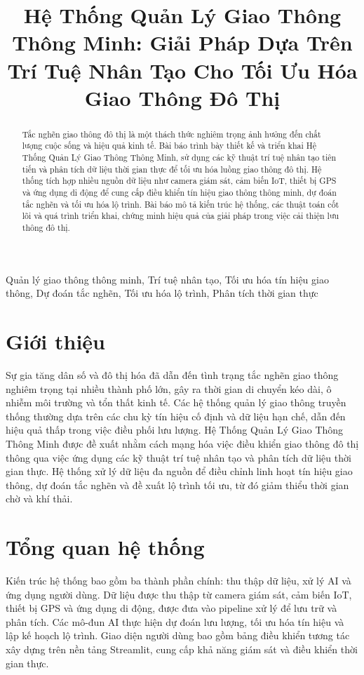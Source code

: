 \documentclass[conference]{IEEEtran}
\title{Hệ Thống Quản Lý Giao Thông Thông Minh: Giải Pháp Dựa Trên Trí Tuệ Nhân Tạo Cho Tối Ưu Hóa Giao Thông Đô Thị}
\author{
    \IEEEauthorblockN{Tên Tác Giả}
    \IEEEauthorblockA{Khoa Công Nghệ Thông Tin\\
    Tên Trường Đại Học\\
    Email: tacgia@example.com}
}
\begin{document}
\maketitle

\begin{abstract}
Tắc nghẽn giao thông đô thị là một thách thức nghiêm trọng ảnh hưởng đến chất lượng cuộc sống và hiệu quả kinh tế. Bài báo trình bày thiết kế và triển khai Hệ Thống Quản Lý Giao Thông Thông Minh, sử dụng các kỹ thuật trí tuệ nhân tạo tiên tiến và phân tích dữ liệu thời gian thực để tối ưu hóa luồng giao thông đô thị. Hệ thống tích hợp nhiều nguồn dữ liệu như camera giám sát, cảm biến IoT, thiết bị GPS và ứng dụng di động để cung cấp điều khiển tín hiệu giao thông thông minh, dự đoán tắc nghẽn và tối ưu hóa lộ trình. Bài báo mô tả kiến trúc hệ thống, các thuật toán cốt lõi và quá trình triển khai, chứng minh hiệu quả của giải pháp trong việc cải thiện lưu thông đô thị.
\end{abstract}

\begin{IEEEkeywords}
Quản lý giao thông thông minh, Trí tuệ nhân tạo, Tối ưu hóa tín hiệu giao thông, Dự đoán tắc nghẽn, Tối ưu hóa lộ trình, Phân tích thời gian thực
\end{IEEEkeywords}

\section{Giới thiệu}
Sự gia tăng dân số và đô thị hóa đã dẫn đến tình trạng tắc nghẽn giao thông nghiêm trọng tại nhiều thành phố lớn, gây ra thời gian di chuyển kéo dài, ô nhiễm môi trường và tổn thất kinh tế. Các hệ thống quản lý giao thông truyền thống thường dựa trên các chu kỳ tín hiệu cố định và dữ liệu hạn chế, dẫn đến hiệu quả thấp trong việc điều phối lưu lượng. Hệ Thống Quản Lý Giao Thông Thông Minh được đề xuất nhằm cách mạng hóa việc điều khiển giao thông đô thị thông qua việc ứng dụng các kỹ thuật trí tuệ nhân tạo và phân tích dữ liệu thời gian thực. Hệ thống xử lý dữ liệu đa nguồn để điều chỉnh linh hoạt tín hiệu giao thông, dự đoán tắc nghẽn và đề xuất lộ trình tối ưu, từ đó giảm thiểu thời gian chờ và khí thải.

\section{Tổng quan hệ thống}
Kiến trúc hệ thống bao gồm ba thành phần chính: thu thập dữ liệu, xử lý AI và ứng dụng người dùng. Dữ liệu được thu thập từ camera giám sát, cảm biến IoT, thiết bị GPS và ứng dụng di động, được đưa vào pipeline xử lý để lưu trữ và phân tích. Các mô-đun AI thực hiện dự đoán lưu lượng, tối ưu hóa tín hiệu và lập kế hoạch lộ trình. Giao diện người dùng bao gồm bảng điều khiển tương tác xây dựng trên nền tảng Streamlit, cung cấp khả năng giám sát và điều khiển thời gian thực.
\end{document}
